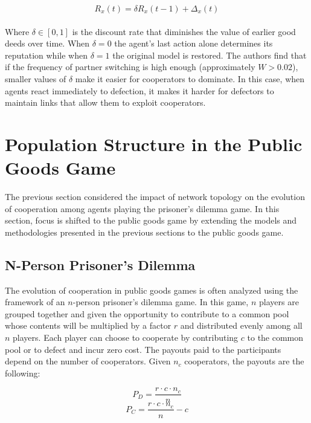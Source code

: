 \documentclass{article}
\begin{document}
	\begin{equation}
	R_x(t)=\delta R_x(t-1)+\Delta_x(t)
	\end{equation}

	\paragraph{}Where $\delta\in[0,1]$ is the discount rate that diminishes the value of earlier good deeds over time.  When $\delta=0$ the agent's last action alone determines its reputation while when $\delta=1$ the original model is restored.  The authors find that if the frequency of partner switching is high enough (approximately $W>0.02$), smaller values of $\delta$ make it easier for cooperators to dominate.  In this case, when agents react immediately to defection, it makes it harder for defectors to maintain links that allow them to exploit cooperators.
	
	\section{Population Structure in the Public Goods Game}
	The previous section considered the impact of network topology on the evolution of cooperation among agents playing the prisoner's dilemma game.  In this section, focus is shifted to the public goods game by extending the models and methodologies presented in the previous sections to the public goods game.

	\subsection{N-Person Prisoner's Dilemma}
	The evolution of cooperation in public goods games is often analyzed using the framework of an $n$-person prisoner's dilemma game.  In this game, $n$ players are grouped together and given the opportunity to contribute to a common pool whose contents will be multiplied by a factor $r$ and distributed evenly among all $n$ players.  Each player can choose to cooperate by contributing $c$ to the common pool or to defect and incur zero cost.  The payouts paid to the participants depend on the number of cooperators.  Given $n_c$ cooperators, the payouts are the following:

	\begin{equation}
	P_D=\frac{r\cdot c\cdot n_c}{n}
	\end{equation}
	\begin{equation}
	P_C=\frac{r\cdot c\cdot n_c}{n}-c
	\end{equation}
\end{document}
